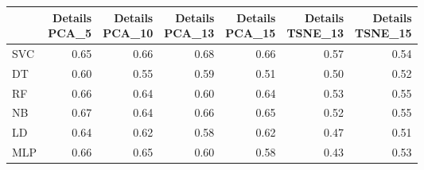 \documentclass[12pt,italian]{report}
\begin{document}
\begin{table}[h]
	\begin{center}
		\begin{adjustbox}{max width=\textwidth}
			\begin{tabular}{lrrrrrr}
				\toprule
				{} &  \thead{Details\\PCA\_5} &  \thead{Details\\PCA\_10} &  \thead{Details\\PCA\_13} &  \thead{Details\\PCA\_15} &  \thead{Details\\TSNE\_13} &  \thead{Details\\TSNE\_15} \\
				\midrule
				SVC &                  0.65 &                   0.66 &                   \cellcolor{orange}0.68 &                   0.66 &                    0.57 &                    0.54 \\
				DT  &                  \cellcolor{cyan}0.60 &                   0.55 &                   0.59 &                   0.51 &                    0.50 &                    0.52 \\
				RF  &                  \cellcolor{cyan}0.66 &                   0.64 &                   0.60 &                   0.64 &                    0.53 &                    0.55 \\
				NB  &                  \cellcolor{cyan}0.67 &                   0.64 &                   0.66 &                   0.65 &                    0.52 &                    0.55 \\
				LD  &                  \cellcolor{cyan}0.64 &                   0.62 &                   0.58 &                   0.62 &                    0.47 &                    0.51 \\
				MLP &                  \cellcolor{cyan}0.66 &                   0.65 &                   0.60 &                   0.58 &                    0.43 &                    0.53 \\
				\bottomrule
			\end{tabular}
		\end{adjustbox}
	\end{center}
\end{table}
\end{document}
